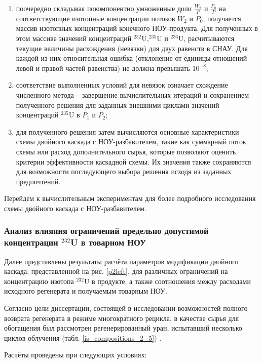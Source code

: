 \begin{enumerate}
    \item поочередно складывая покомпонентно умноженные доли $\frac{W_{2}}{P}$ и $\frac{P_{0}}{P}$ на соответствующие изотопные концентрации потоков $W_2$ и $P_0$, получается массив изотопных концентраций конечного НОУ-продукта. Для полученных в этом массиве значений концентраций $^{232}$U,$^{235}$U и $^{236}$U, расчитываются текущие величины расхождения (невязки) для двух равенств в СНАУ. Для каждой из них относительная ошибка (отклонение от единицы отношений левой и правой частей равенства) не должна превышать $10^{-8}$;
    \item соответствие выполненных условий для невязок означает схождение численного метода -- завершение вычислительных итераций и сохранением полученного решения для заданных внешними циклами значений концентраций $^{235}$U в $P_1$ и $P_2$;
    \item для полученного решения затем вычисляются основные характеристики схемы двойного каскада с НОУ-разбавителем, такие как суммарный поток схемы или расход дополнительного сырья, которые позволяют оценить критерии эффективности каскадной схемы. Их значения также сохраняются для возможности последующего выбора решения исходя из заданных предпочтений.
\end{enumerate}

Перейдем к вычислительным экспериментам для более подробного исследования схемы двойного каскада с НОУ-разбавителем.

\subsubsection{Анализ влияния ограничений предельно допустимой концентрации $^{232}$U в товарном НОУ}

Далее представлены результаты расчёта параметров модификации двойного каскада, представленной на рис. \ref{p2left}, для различных ограничений на концентрацию изотопа $^{232}$U в продукте, а также соотношения между расходами исходного регенерата и получаемым товарным НОУ.

Согласно цели диссертации, состоящей в исследовании возможностей полного возврата регенерата в режиме многократного рецикла, в качестве сырья для обогащения был рассмотрен регенерированный уран, испытавший несколько циклов облучения (табл. \ref{is_compositions_2_5}) \cite{palkinDesignanalyticalResearchRefinement2010}.

Расчёты проведены при следующих условиях:

